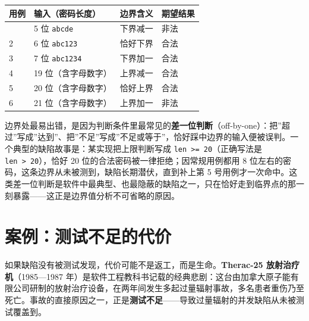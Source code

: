 \documentclass[12pt,a4paper,twoside,openany]{ctexbook}
\numberwithin{figure}{chapter}
\numberwithin{table}{chapter}
\newcounter{none}
\begin{document}
{\def\LTcaptype{none} %
\begin{longtable}[]{@{}llll@{}}
\toprule\noalign{}
用例 & 输入（密码长度） & 边界含义 & 期望结果 \\
\midrule\noalign{}
\endhead
\bottomrule\noalign{}
\endlastfoot
1 & 5 位 \texttt{abcde} & 下界减一 & 非法 \\
2 & 6 位 \texttt{abc123} & 恰好下界 & 合法 \\
3 & 7 位 \texttt{abc1234} & 下界加一 & 合法 \\
4 & 19 位（含字母数字） & 上界减一 & 合法 \\
5 & 20 位（含字母数字） & 恰好上界 & 合法 \\
6 & 21 位（含字母数字） & 上界加一 & 非法 \\
\end{longtable}
}

边界处最易出错，是因为判断条件里最常见的\textbf{差一位判断}（off-by-one）：把''超过''写成''达到''、把''不足''写成''不足或等于''，恰好踩中边界的输入便被误判。一个典型的缺陷故事是：某实现把上限判断写成
\texttt{len\ \textgreater{}=\ 20}（正确写法是
\texttt{len\ \textgreater{}\ 20}），恰好 20
位的合法密码被一律拒绝；因常规用例都用 8
位左右的密码，这条边界从未被测到，缺陷长期潜伏，直到补上第 5
号用例才一次命中。这类差一位判断是软件中最典型、也最隐蔽的缺陷之一，只在恰好走到临界点的那一刻暴露------这正是边界值分析不可省略的原因。

\section{案例：测试不足的代价}\label{ux6848ux4f8bux6d4bux8bd5ux4e0dux8db3ux7684ux4ee3ux4ef7}

如果缺陷没有被测试发现，代价可能不是返工，而是生命。\textbf{Therac-25
放射治疗机}（1985---1987
年）是软件工程教科书记载的经典悲剧：这台由加拿大原子能有限公司研制的放射治疗设备，在两年间发生多起过量辐射事故，多名患者重伤乃至死亡。事故的直接原因之一，正是\textbf{测试不足}------导致过量辐射的并发缺陷从未被测试覆盖到。
\end{document}
